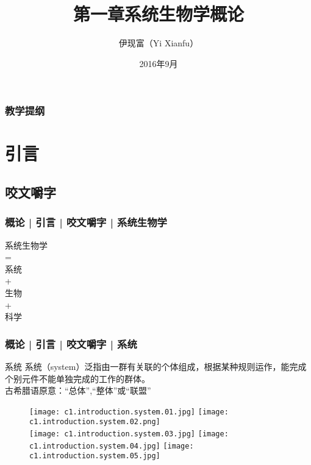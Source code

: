 



\title[概论]{第一章\quad 系统生物学概论}
\author[Yixf]{伊现富（Yi Xianfu）}
\date{2016年9月}

%

\begin{frame}[label=current]
  \titlepage
\end{frame}

\begin{frame}[plain,label=current]
  \frametitle{教学提纲}
  \setcounter{tocdepth}{3}
  \begin{multicols}{2}
    \tableofcontents
  \end{multicols}
\end{frame}


\section{引言}
\subsection{咬文嚼字}
\begin{frame}
  \frametitle{概论 | 引言 | 咬文嚼字 | 系统生物学}
  \begin{huge}
  \begin{center}
  系统生物学 \\ = \\ 系统 \\ + \\ 生物 \\ + \\ 科学   
\end{center}
  \end{huge}
\end{frame}

\begin{frame}
  \frametitle{概论 | 引言 | 咬文嚼字 | 系统}
  \begin{block}{系统}
    系统（system）泛指由一群有关联的个体组成，根据某种规则运作，能完成个别元件不能单独完成的工作的群体。\\
    古希腊语原意：“总体”,“整体”或“联盟”
  \end{block}
  \pause
  \begin{figure}
    \centering
    \texttt{[image: c1.introduction.system.01.jpg]}\qquad
    \texttt{[image: c1.introduction.system.02.png]}\\
    \texttt{[image: c1.introduction.system.03.jpg]}\quad
    \texttt{[image: c1.introduction.system.04.jpg]}\quad
    \texttt{[image: c1.introduction.system.05.jpg]}
  \end{figure}
\end{frame}

